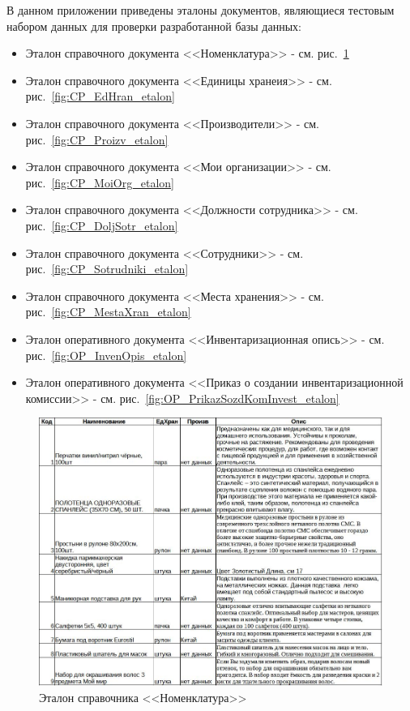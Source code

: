 \documentclass[12pt, a4paper, simple]{eskdtext}
\begin{document}
    

    \thispagestyle{plain}
    \pagestyle{plain}
    \hspace{0pt}

    В данном приложении приведены эталоны документов,
    являющиеся тестовым набором данных для проверки разработанной базы данных:

    \begin{itemize}
        \item Эталон справочного документа <<Номенклатура>> - см. рис.~\ref{fig:CP_Nomenclatura_etalon}
        \item Эталон справочного документа <<Единицы хранеия>> - см. рис.~\ref{fig:CP_EdHran_etalon}
        \item Эталон справочного документа <<Производители>> - см. рис.~\ref{fig:CP_Proizv_etalon}
        \item Эталон справочного документа <<Мои организации>> - см. рис.~\ref{fig:CP_MoiOrg_etalon}
        \item Эталон справочного документа <<Должности сотрудника>> - см. рис.~\ref{fig:CP_DoljSotr_etalon}
        \item Эталон справочного документа <<Сотрудники>> - см. рис.~\ref{fig:CP_Sotrudniki_etalon}
        \item Эталон справочного документа <<Места хранения>> - см. рис.~\ref{fig:CP_MestaXran_etalon}
        \item Эталон оперативного документа <<Инвентаризационная опись>> - см. рис.~\ref{fig:OP_InvenOpis_etalon}
        \item Эталон оперативного документа <<Приказ о создании инвентаризационной комиссии>> - см. рис.~\ref{fig:OP_PrikazSozdKomInvest_etalon}
    \end{itemize}

    \begin{figure}[!h]
        \centering
        \includegraphics[width=18cm]
            {_docs/СП_Номенкл_эталон.jpg}
        \caption{Эталон справочника <<Номенклатура>>}
        \label{fig:CP_Nomenclatura_etalon}
    \end{figure}
    
\end{document}
